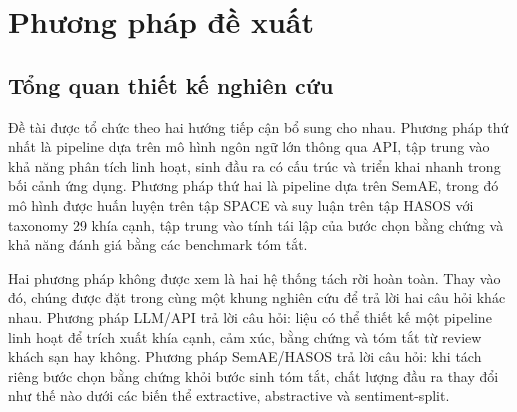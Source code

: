 %     
%

\chapter{Phương pháp đề xuất}

\section{Tổng quan thiết kế nghiên cứu}

Đề tài được tổ chức theo hai hướng tiếp cận bổ sung cho nhau. Phương pháp thứ nhất là pipeline dựa trên mô hình ngôn ngữ lớn thông qua API, tập trung vào khả năng phân tích linh hoạt, sinh đầu ra có cấu trúc và triển khai nhanh trong bối cảnh ứng dụng. Phương pháp thứ hai là pipeline dựa trên SemAE, trong đó mô hình được huấn luyện trên tập SPACE và suy luận trên tập HASOS với taxonomy 29 khía cạnh, tập trung vào tính tái lập của bước chọn bằng chứng và khả năng đánh giá bằng các benchmark tóm tắt.

Hai phương pháp không được xem là hai hệ thống tách rời hoàn toàn. Thay vào đó, chúng được đặt trong cùng một khung nghiên cứu để trả lời hai câu hỏi khác nhau. Phương pháp LLM/API trả lời câu hỏi: liệu có thể thiết kế một pipeline linh hoạt để trích xuất khía cạnh, cảm xúc, bằng chứng và tóm tắt từ review khách sạn hay không. Phương pháp SemAE/HASOS trả lời câu hỏi: khi tách riêng bước chọn bằng chứng khỏi bước sinh tóm tắt, chất lượng đầu ra thay đổi như thế nào dưới các biến thể extractive, abstractive và sentiment-split.

